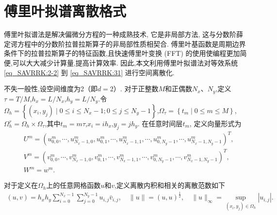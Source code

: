\section{傅里叶拟谱离散格式}\label{Section_SAVRRK: 3}
傅里叶拟谱法是解决偏微分方程的一种成熟技术, 它是非局部方法,
这与分数阶薛定谔方程中的分数阶拉普拉斯算子的非局部性质相契合.
傅里叶基函数是周期边界条件下的拉普拉斯算子的特征函数,且快速傅里叶变换 (FFT) 的使用使编程更加简便,可以大大减少计算量,提高计算效率.
因此,本文利用傅里叶拟谱法对等效系统 \eqref{eq_SAVRRK:2-2} 到 \eqref{eq_SAVRRK:31} 进行空间离散化.

不失一般性,设空间维度为2（即$d=2$）. 对于正整数$M$和正偶数$N_{x}$、$N_{y}$,定义$\tau={T}/{M}$,$h_{x}={L}/{N_{x}}$,$h_{y}={L}/{N_{y}}$.令$\Omega_{h}=\left\{(x_{i}, y_{j}) \mid 0 \leq i \leq N_x-1;0 \leq j \leq N_y-1\right\}$,$\Omega_{\tau}=\left\{t_{m} \mid 0 \leq m \leq M\right\}$,$\Omega_{h}^{\tau}=\Omega_{h} \times \Omega_{\tau}$,其中$t_{m}=m \tau$,$x_{i}=i h_{x}$,$y_{j}=j h_{y}$.
在任意时间层$t_m$, 定义向量形式为
\begin{align}\label{eq_SAVRRK:47}
&U^m=\left(u_{0,0}^m, \cdots, u_{N_{x}-1,0}^m, u_{0,1}^m, \cdots, u_{N_{x}-1,1}^m, \cdots, u_{0, N_{y}-1}^m, \cdots, u_{N_{x}-1, N_{y}-1}^m\right)^{T},\\
&V^m=\left(v_{0,0}^m, \cdots, v_{N_{x}-1,0}^m, v_{0,1}^m, \cdots, v_{N_{x}-1,1}^m, \cdots, v_{0, N_{y}-1}^m, \cdots, v_{N_{x}-1, N_{y}-1}^m\right)^{T},\\
&W^m=w^m.
\end{align}

对于定义在$\Omega_{h}$上的任意网格函数$u$和$v$,定义离散内积和相关的离散范数如下
\begin{align}\label{eq_SAVRRK:48}
(u, v)=h_{x} h_{y} \sum_{i=0}^{N_{x}-1} \sum_{j=0}^{N_{y}-1} u_{i, j} \bar{v}_{i, j},\quad\|u\|=(u, u)^{\frac{1}{2}},\quad\|u\|_{\infty}=\sup _{\left(x_{i}, y_{j}\right) \in \Omega_{h}}\left|u_{i, j}\right|.
\end{align}

